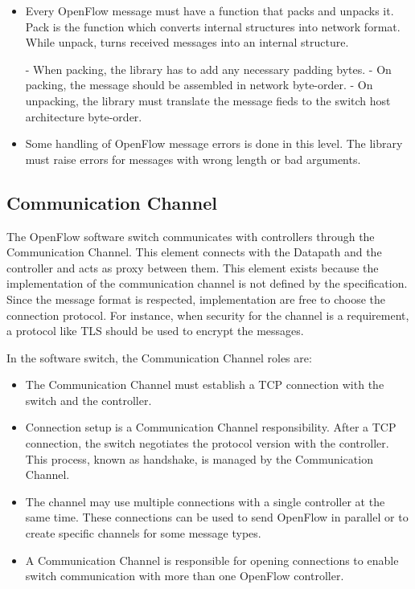     \begin{itemize}
    
    \item Every OpenFlow message must have a function that packs and unpacks it. Pack is the function which converts internal structures into network format. While unpack, turns received messages into an internal structure.
    
        \subitem - When packing, the library has to add any necessary padding bytes.
        \subitem - On packing, the message should be assembled in network byte-order.
        \subitem - On unpacking, the library must translate the message fieds to the switch host architecture byte-order.
    
    \item Some handling of OpenFlow message errors is done in this level. The library must raise errors for messages with wrong length or bad arguments. 
    
    \end{itemize}

    \subsection{Communication Channel}	

    The OpenFlow software switch communicates with controllers through the Communication Channel. This element connects with the Datapath and the controller and acts as proxy between them. This element exists because the implementation of the communication channel is not defined by the specification. Since the message format is respected, implementation are free to choose the connection protocol. For instance, when security for the channel is a requirement, a protocol like TLS should be used to encrypt the messages. 
    
    In the software switch, the Communication Channel roles are:
    
    \begin{itemize}
    
    \item The Communication Channel must establish a TCP connection with the switch and the controller.
    
    \item Connection setup is a Communication Channel responsibility. After a TCP connection, the switch negotiates the protocol version with the controller. This process, known as handshake, is managed by the Communication Channel. 
    
    \item The channel may use multiple connections with a single controller at the same time. These connections can be used to send OpenFlow in parallel or to create specific channels for some message types.
    
    \item A Communication Channel is responsible for opening connections to enable switch communication with more than one OpenFlow controller. 
    
    \end{itemize}
    
    
    